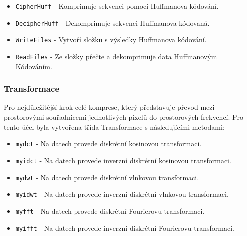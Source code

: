 \begin{itemize}
    \item \texttt{CipherHuff} - Komprimuje sekvenci pomocí Huffmanova kódování.
    \item \texttt{DecipherHuff}  - Dekomprimuje sekvenci Huffmanova kódovaná.
    \item \texttt{WriteFiles} - Vytvoří složku s výsledky Huffmanova kódování.
    \item \texttt{ReadFiles} - Ze složky přečte a dekomprimuje data Huffmanovým Kódováním.
\end{itemize}

\subsubsection*{Transformace}

Pro nejdůležitější krok celé komprese, který představuje převod mezi prostorovými souřadnicemi jednotlivých pixelů do prostorových frekvencí. Pro tento účel byla vytvořena třída Transformace s následujícími metodami:

\begin{itemize}
    \item \texttt{mydct} - Na datech provede diskrétní kosinovou transformaci.
    \item \texttt{myidct}  - Na datech provede inverzní diskrétní kosinovou transformaci. 
    \item \texttt{mydwt} - Na datech provede diskrétní vlnkovou transformaci.
    \item \texttt{myidwt} - Na datech provede inverzní diskrétní vlnkovou transformaci.
    \item \texttt{myfft} - Na datech provede diskrétní Fourierovu transformaci.
    \item \texttt{myifft} - Na datech provede inverzní diskrétní Fourierovu transformaci.
\end{itemize}